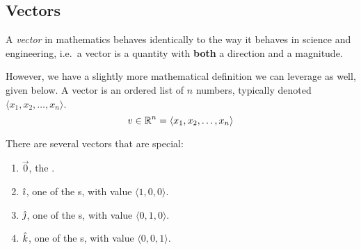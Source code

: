 \subsection{Vectors}\label{subsec:Vectors}
\begin{definition}[Vector]\label{def:Vector}
  A \emph{vector} in mathematics behaves identically to the way it behaves in science and engineering, i.e.\ a vector is a quantity with \textbf{both} a direction and a magnitude.

  However, we have a slightly more mathematical definition we can leverage as well, given below.
  A vector is an ordered list of $n$ numbers, typically denoted $\langle x_{1}, x_{2}, \ldots, x_{n} \rangle$.
  \begin{equation}\label{eq:Vector}
    v \in \operatorname{\mathbb{R}}^{n} = \langle x_{1}, x_{2}, \ldots, x_{n} \rangle
  \end{equation}
\end{definition}

There are several vectors that are special:
\begin{enumerate}[noitemsep]
\item $\vec{0}$, the .
\item $\hat{\imath}$, one of the s, with value $\langle 1, 0, 0 \rangle$.
\item $\hat{\jmath}$, one of the s, with value $\langle 0, 1, 0 \rangle$.
\item $\hat{k}$, one of the s, with value $\langle 0, 0, 1 \rangle$.
\end{enumerate}



